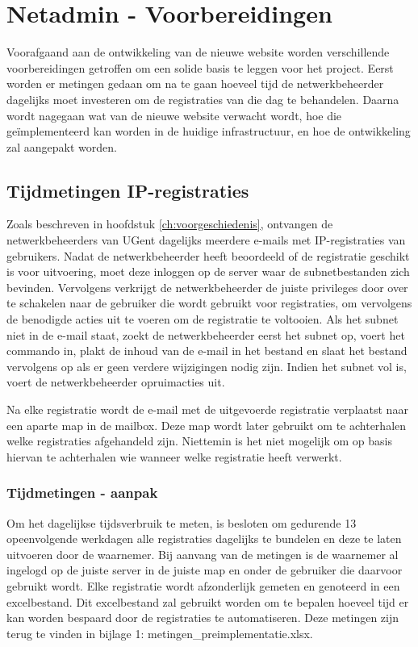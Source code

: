 
\chapter{Netadmin - Voorbereidingen}%
\label{ch:netadmin-voorbereidingen}

Voorafgaand aan de ontwikkeling van de nieuwe website worden verschillende voorbereidingen getroffen om een solide basis te leggen voor het project. Eerst worden er metingen gedaan om na te gaan hoeveel tijd de netwerkbeheerder dagelijks moet investeren om de registraties van die dag te behandelen. Daarna wordt nagegaan wat van de nieuwe website verwacht wordt, hoe die geïmplementeerd kan worden in de huidige infrastructuur, en hoe de ontwikkeling zal aangepakt worden.

\section{Tijdmetingen IP-registraties}
Zoals beschreven in hoofdstuk \ref{ch:voorgeschiedenis}, ontvangen de netwerkbeheerders van UGent dagelijks meerdere e-mails met IP-registraties van gebruikers. Nadat de netwerkbeheerder heeft beoordeeld of de registratie geschikt is voor uitvoering, moet deze inloggen op de server waar de subnetbestanden zich bevinden. Vervolgens verkrijgt de netwerkbeheerder de juiste privileges door over te schakelen naar de gebruiker die wordt gebruikt voor registraties, om vervolgens de benodigde acties uit te voeren om de registratie te voltooien. Als het subnet niet in de e-mail staat, zoekt de netwerkbeheerder eerst het subnet op, voert het commando in, plakt de inhoud van de e-mail in het bestand en slaat het bestand vervolgens op als er geen verdere wijzigingen nodig zijn. Indien het subnet vol is, voert de netwerkbeheerder opruimacties uit.

Na elke registratie wordt de e-mail met de uitgevoerde registratie verplaatst naar een aparte map in de mailbox. Deze map wordt later gebruikt om te achterhalen welke registraties afgehandeld zijn. Niettemin is het niet mogelijk om op basis hiervan te achterhalen wie wanneer welke registratie heeft verwerkt.

\subsection{Tijdmetingen - aanpak}
Om het dagelijkse tijdsverbruik te meten, is besloten om gedurende 13 opeenvolgende werkdagen alle registraties dagelijks te bundelen en deze te laten uitvoeren door de waarnemer. Bij aanvang van de metingen is de waarnemer al ingelogd op de juiste server in de juiste map en onder de gebruiker die daarvoor gebruikt wordt. Elke registratie wordt afzonderlijk gemeten en genoteerd in een excelbestand. Dit excelbestand zal gebruikt worden om te bepalen hoeveel tijd er kan worden bespaard door de registraties te automatiseren. Deze metingen zijn terug te vinden in bijlage 1: metingen\_preimplementatie.xlsx.

